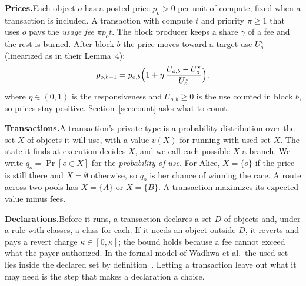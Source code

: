 \documentclass[conference,compsoc]{IEEEtran}
\numberwithin{equation}{section}
\theoremstyle{plain}
\theoremstyle{definition}
\theoremstyle{remark}
\newcommand{\runin}[1]{\par\smallskip\noindent\textbf{#1.}\enspace}
\begin{document}
\runin{Prices}Each object $o$ has a posted price $p_o > 0$ per unit of compute, fixed when a transaction is included. A transaction with compute $t$ and priority $\pi \ge 1$ that uses $o$ pays the \emph{usage fee} $\pi p_o t$. The block producer keeps a share $\gamma$ of a fee and the rest is burned. After block $b$ the price moves toward a target use $U^\star_o$ (linearized as in their Lemma~4):
\begin{equation}\label{eq:price}
p_{o,b+1} = p_{o,b}\Bigl(1 + \eta\,\frac{U_{o,b} - U^\star_o}{U^\star_o}\Bigr),
\end{equation}
where $\eta \in (0,1)$ is the responsiveness and $U_{o,b} \ge 0$ is the use counted in block $b$, so prices stay positive. Section~\ref{sec:count} asks what to count.

\runin{Transactions}A transaction's private type is a probability distribution over the set $X$ of objects it will use, with a value $v(X)$ for running with used set $X$. The state it finds at execution decides $X$, and we call each possible $X$ a branch. We write $q_o = \Pr[o \in X]$ for the \emph{probability of use}. For Alice, $X = \{o\}$ if the price is still there and $X = \emptyset$ otherwise, so $q_o$ is her chance of winning the race. A route across two pools has $X = \{A\}$ or $X = \{B\}$. A transaction maximizes its expected value minus fees.

\runin{Declarations}Before it runs, a transaction declares a set $D$ of objects and, under a rule with classes, a class for each. If it needs an object outside $D$, it reverts and pays a revert charge $\kappa \in [0, \bar\kappa]$; the bound holds because a fee cannot exceed what the payer authorized. In the formal model of Wadhwa et al.\ the used set lies inside the declared set by definition~\cite[p.~1090]{wadhwa2026perils}. Letting a transaction leave out what it may need is the step that makes a declaration a choice.
\end{document}
